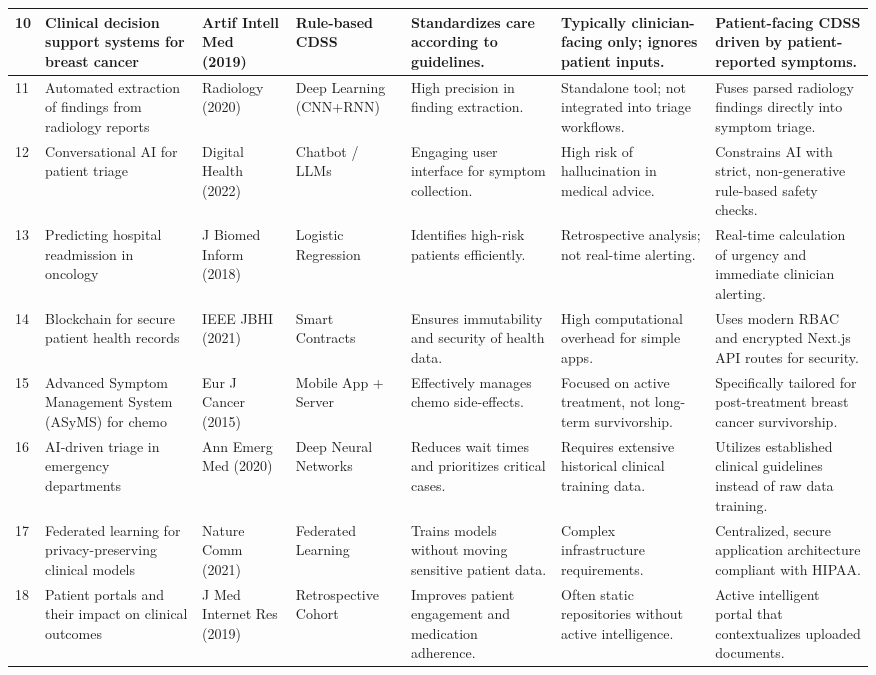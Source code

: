 \documentclass[10pt,journal,compsoc]{IEEEtran}
\begin{document}
\begin{longtable}{|p{0.5cm}|p{3cm}|p{1.5cm}|p{2cm}|p{2.5cm}|p{3cm}|p{3.5cm}|}
10 & Clinical decision support systems for breast cancer & Artif Intell Med (2019) & Rule-based CDSS & Standardizes care according to guidelines. & Typically clinician-facing only; ignores patient inputs. & Patient-facing CDSS driven by patient-reported symptoms. \\ \hline
11 & Automated extraction of findings from radiology reports & Radiology (2020) & Deep Learning (CNN+RNN) & High precision in finding extraction. & Standalone tool; not integrated into triage workflows. & Fuses parsed radiology findings directly into symptom triage. \\ \hline
12 & Conversational AI for patient triage & Digital Health (2022) & Chatbot / LLMs & Engaging user interface for symptom collection. & High risk of hallucination in medical advice. & Constrains AI with strict, non-generative rule-based safety checks. \\ \hline
13 & Predicting hospital readmission in oncology & J Biomed Inform (2018) & Logistic Regression & Identifies high-risk patients efficiently. & Retrospective analysis; not real-time alerting. & Real-time calculation of urgency and immediate clinician alerting. \\ \hline
14 & Blockchain for secure patient health records & IEEE JBHI (2021) & Smart Contracts & Ensures immutability and security of health data. & High computational overhead for simple apps. & Uses modern RBAC and encrypted Next.js API routes for security. \\ \hline
15 & Advanced Symptom Management System (ASyMS) for chemo & Eur J Cancer (2015) & Mobile App + Server & Effectively manages chemo side-effects. & Focused on active treatment, not long-term survivorship. & Specifically tailored for post-treatment breast cancer survivorship. \\ \hline
16 & AI-driven triage in emergency departments & Ann Emerg Med (2020) & Deep Neural Networks & Reduces wait times and prioritizes critical cases. & Requires extensive historical clinical training data. & Utilizes established clinical guidelines instead of raw data training. \\ \hline
17 & Federated learning for privacy-preserving clinical models & Nature Comm (2021) & Federated Learning & Trains models without moving sensitive patient data. & Complex infrastructure requirements. & Centralized, secure application architecture compliant with HIPAA. \\ \hline
18 & Patient portals and their impact on clinical outcomes & J Med Internet Res (2019) & Retrospective Cohort & Improves patient engagement and medication adherence. & Often static repositories without active intelligence. & Active intelligent portal that contextualizes uploaded documents. \\ \hline

\end{longtable}
\end{document}
